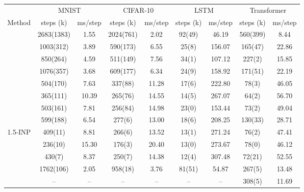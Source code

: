 \begin{tabular}{l cc cc cc cc}
\toprule
 & \multicolumn{2}{c}{MNIST} & \multicolumn{2}{c}{CIFAR-10} & \multicolumn{2}{c}{LSTM} & \multicolumn{2}{c}{Transformer} \\
\cmidrule(lr){2-3}\cmidrule(lr){4-5}\cmidrule(lr){6-7}\cmidrule(lr){8-9}
Method & steps (k) & ms/step & steps (k) & ms/step & steps (k) & ms/step & steps (k) & ms/step \\
\midrule
\BP{} & 2683(1383) & 1.55 & 2024(761) & 2.02 & 92(49) & 46.19 & 560(399) & 8.44 \\
\SPSA{} & 1003(312) & 3.89 & 590(173) & 6.55 & 25(8) & 156.07 & 165(47) & 22.86 \\
\SPSAb{} & 850(264) & 4.59 & 511(149) & 7.56 & 34(1) & 107.12 & 227(2) & 15.85 \\
\RS{} & 1076(357) & 3.68 & 609(177) & 6.34 & 24(9) & 158.92 & 171(51) & 22.19 \\
\NP{} & 504(170) & 7.63 & 337(88) & 11.28 & 17(6) & 222.80 & 78(3) & 46.05 \\
\ANP{} & 365(111) & 10.39 & 265(76) & 14.55 & 14(5) & 267.07 & 64(2) & 56.70 \\
\ANPb{} & 503(161) & 7.81 & 256(84) & 14.98 & 23(0) & 153.44 & 73(2) & 49.04 \\
\INP{} & 599(188) & 6.54 & 277(6) & 13.00 & 18(6) & 208.25 & 130(33) & 28.71 \\
1.5-INP & 409(11) & 8.81 & 266(6) & 13.52 & 13(1) & 271.24 & 76(2) & 47.41 \\
\DUST{} & 236(10) & 15.30 & 176(3) & 20.40 & 13(0) & 273.67 & 78(0) & 46.12 \\
\DANP{} & 430(7) & 8.37 & 250(7) & 14.38 & 12(4) & 307.48 & 72(21) & 52.55 \\
\FF{} & 1762(106) & 2.05 & 958(18) & 3.76 & 81(51) & 54.87 & 267(5) & 13.48 \\
\IPC{} & -- & -- & -- & -- & -- & -- & 308(5) & 11.69 \\
\bottomrule
\end{tabular}
